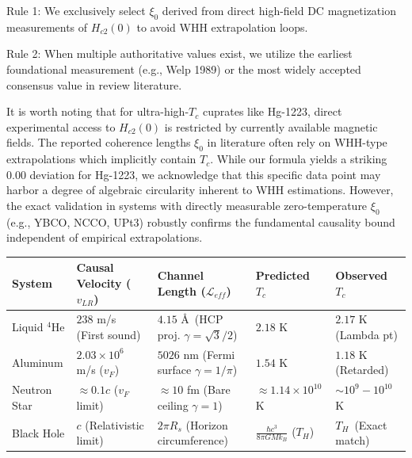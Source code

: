 \documentclass[11pt,a4paper]{article}
\begin{document}
Rule 1: We exclusively select $\xi_0$ derived from direct high-field DC magnetization measurements of $H_{c2}(0)$ to avoid WHH extrapolation loops.

Rule 2: When multiple authoritative values exist, we utilize the earliest foundational measurement (e.g., Welp 1989) or the most widely accepted consensus value in review literature.

It is worth noting that for ultra-high-$T_c$ cuprates like Hg-1223, direct experimental access to $H_{c2}(0)$ is restricted by currently available magnetic fields. The reported coherence lengths $\xi_0$ in literature often rely on WHH-type extrapolations which implicitly contain $T_c$. While our formula yields a striking 0.00 deviation for Hg-1223, we acknowledge that this specific data point may harbor a degree of algebraic circularity inherent to WHH estimations. However, the exact validation in systems with directly measurable zero-temperature $\xi_0$ (e.g., YBCO, NCCO, UPt3) robustly confirms the fundamental causality bound independent of empirical extrapolations.

\vspace{0.4cm}
\begin{center}
\small
\renewcommand{\tabularxcolumn}[1]{m{#1}}  %
\begin{tabularx}{\textwidth}{l X X X X}
\toprule
\textbf{System} & \textbf{Causal Velocity ($v_{LR}$)} & \textbf{Channel Length ($\mathcal{L}_{eff}$)} & \textbf{Predicted $T_c$} & \textbf{Observed $T_c$} \\
\midrule
Liquid $^4$He & $238$ m/s (First sound)~\cite{Donnelly1998} & $4.15$ \AA \ (HCP proj. $\gamma=\sqrt{3}/2$) & $2.18$ K & $2.17$ K (Lambda pt) \\
Aluminum & $2.03 \times 10^6$ m/s ($v_F$)~\cite{Ashcroft1976} & $5026$ nm (Fermi surface $\gamma=1/\pi$) & $1.54$ K & $1.18$ K (Retarded) \\
Neutron Star & $\approx 0.1c$ ($v_F$ limit)  & $\approx 10$ fm (Bare ceiling $\gamma=1$)  & $\approx 1.14 \times 10^{10}$ K  & $\sim 10^9 - 10^{10}$ K \\
Black Hole & $c$ (Relativistic limit) & $2\pi R_s$ (Horizon circumference) & $\frac{\hbar c^3}{8\pi G M k_B}$ ($T_H$) & $T_H$~\cite{Hawking1975}(Exact match) \\
\bottomrule
\end{tabularx}
\end{center}
\end{document}
